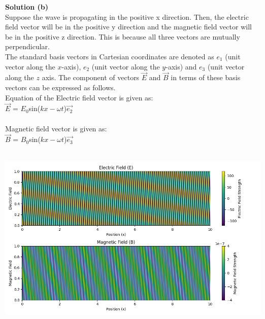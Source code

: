 \documentclass[journal,12pt,twocolumn]{IEEEtran}
\theoremstyle{remark}
\begin{document}
\newpage
\begin{flushleft}
    \textbf{Solution (b)}\\
    Suppose the wave is propagating in the positive x direction. Then, the electric field vector will be in the positive y direction and the magnetic field vector will be in the positive z direction. This is because all three vectors are mutually perpendicular.\\
    \bigskip
    The standard basis vectors in Cartesian coordinates are denoted as $e_1$ (unit vector along the $x$-axis), $e_2$ (unit vector along the $y$-axis) and $e_3$ (unit vector along the $z$ axis. The component of vectors $\vec{E}$ and $\vec{B}$ in terms of these basis vectors can be expressed as follows.\\
    \bigskip
    Equation of the Electric field vector is given as:\\
    $\vec{E}$ = $E_0$sin($kx - \omega t$)$\vec{e_2}$\\
    \\
    \bigskip
    Magnetic field vector is given as:\\
    $\vec{B}$ = $B_0$sin($kx - \omega t$)$\vec{e_3}$\\
    \\
    
     
\end{flushleft}

\renewcommand{\thefigure}{\theenumi}
\renewcommand{\thetable}{\theenumi}

\newpage
\begin{center}
    
    \includegraphics[width=1.0\textwidth]{figs/Figure1_12.8_8.png}
\end{center}
\end{document}
